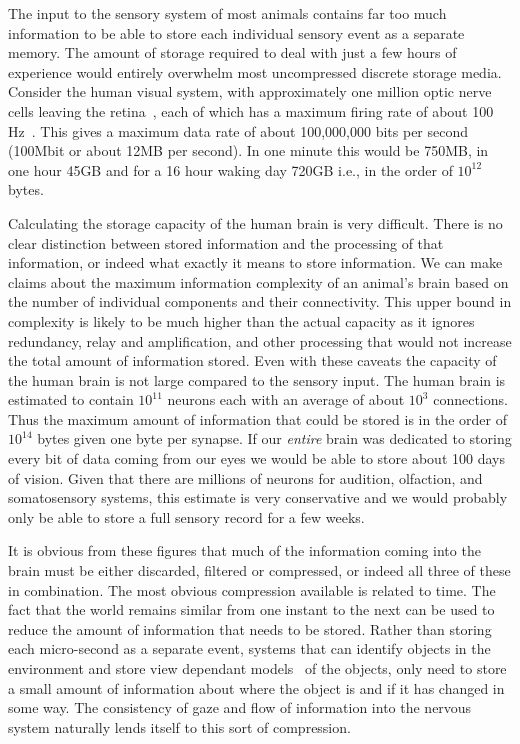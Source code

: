 The input to the sensory system of most animals contains far too much information to be able to store each individual sensory event as a separate memory.  The amount of storage required to deal with just a few hours of experience would entirely overwhelm most uncompressed discrete storage media.  Consider the human visual system, with approximately one million optic nerve cells leaving the retina~\citep{Jonas1992},  each of which has a maximum firing rate of about 100 Hz~\citep{Kim1993}.  This gives a maximum data rate of about 100,000,000 bits per second (100Mbit or about 12MB per second).  In one minute this would be 750MB, in one hour 45GB and for a 16 hour waking day 720GB i.e., in the order of  \(10^{12}\) bytes.  

Calculating the storage capacity of the human brain is very difficult. There is no clear distinction between stored information and the processing of that information, or indeed what exactly it means to store information. We can make claims about the maximum information complexity of an animal's brain based on the number of individual components and their connectivity.  This upper bound in complexity is likely to be much higher than the actual capacity as it ignores redundancy, relay and amplification, and other processing that would not increase the total amount of information stored.  Even with these caveats the capacity of the human brain is not large compared to the sensory input.  The human brain is estimated to contain \(10^{11}\) neurons each with an average of about \(10^{3}\) connections.  Thus the maximum amount of information that could be stored is in the order of \(10^{14}\) bytes given one byte per synapse.  If our {\em entire} brain was dedicated to storing every bit of data coming from our eyes we would be able to store about 100 days of vision.  Given that there are millions of neurons for audition, olfaction, and somatosensory systems, this estimate is very conservative and we would probably only be able to store a full sensory record for a few weeks.

It is obvious from these figures that much of the information coming into the brain must be either discarded, filtered or compressed, or indeed all three of these in combination.  The most obvious compression available is related to time.  The fact that the world remains similar from one instant to the next can be used to reduce the amount of information that needs to be stored.  Rather than storing each micro-second as a separate event, systems that can identify objects in the environment and store view dependant models~\citep{Riesenhuber2002} of the objects, only need to store a small amount of information about where the object is and if it has changed in some way.  The consistency of gaze and flow of information into the nervous system naturally lends itself to this sort of compression.

